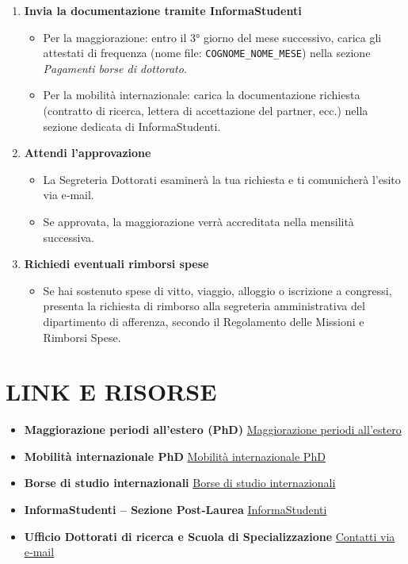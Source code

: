 \documentclass{article}
\begin{document}
\begin{enumerate}[label=\arabic*.]
\begin{itemize}
    \end{itemize}
    \item \textbf{Invia la documentazione tramite InformaStudenti}
    \begin{itemize}
        \item Per la maggiorazione: entro il 3° giorno del mese successivo, carica gli attestati di frequenza (nome file: \texttt{COGNOME\_NOME\_MESE}) nella sezione \textit{Pagamenti borse di dottorato}.
        \item Per la mobilità internazionale: carica la documentazione richiesta (contratto di ricerca, lettera di accettazione del partner, ecc.) nella sezione dedicata di InformaStudenti.
    \end{itemize}
    \item \textbf{Attendi l’approvazione}
    \begin{itemize}
        \item La Segreteria Dottorati esaminerà la tua richiesta e ti comunicherà l’esito via e‑mail.
        \item Se approvata, la maggiorazione verrà accreditata nella mensilità successiva.
    \end{itemize}
    \item \textbf{Richiedi eventuali rimborsi spese}
    \begin{itemize}
        \item Se hai sostenuto spese di vitto, viaggio, alloggio o iscrizione a congressi, presenta la richiesta di rimborso alla segreteria amministrativa del dipartimento di afferenza, secondo il Regolamento delle Missioni e Rimborsi Spese.
    \end{itemize}
\end{enumerate}

\section{LINK E RISORSE}
\begin{itemize}
    \item \textbf{Maggiorazione periodi all’estero (PhD)}  
    \href{https://www.unimi.it/it/studiare/frequentare-un-corso-post-laurea/dottorati-di-ricerca-phd/borse-e-tasse/maggiorazione-periodi-allestero}{Maggiorazione periodi all’estero}
    \item \textbf{Mobilità internazionale PhD}  
    \href{https://www.unimi.it/it/studiare/frequentare-un-corso-post-laurea/dottorati-di-ricerca-phd/mobilita-internazionale-phd}{Mobilità internazionale PhD}
    \item \textbf{Borse di studio internazionali}  
    \href{https://www.unimi.it/it/studiare/borse-premi-mense-e-alloggi/borse-di-studio-internazionali}{Borse di studio internazionali}
    \item \textbf{InformaStudenti – Sezione Post‑Laurea}  
    \href{https://informasstudenti.unimi.it/}{InformaStudenti}
    \item \textbf{Ufficio Dottorati di ricerca e Scuola di Specializzazione}  
    \href{mailto:[email protected]}{Contatti via e‑mail}
\end{itemize}
\end{document}
